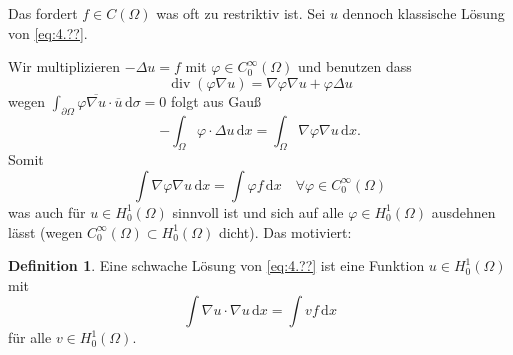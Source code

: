 \documentclass[
paper=a4,
bibtotocnumbered,
liststotocnumbered,
tablecaptionabove,
pointlessnumbers,
twoside,
openright,
10pt
]
{report}
\let\phi\varphi
\theoremstyle{definition}
\newtheorem*{df}{Definition}
\numberwithin{equation}{chapter}
\begin{document}
Das fordert $f\in C(\Omega)$ was oft zu restriktiv ist. Sei $u$ dennoch klassische Lösung von \eqref{eq:4.??}. 

Wir multiplizieren $-\Delta u=f$ mit $\phi \in C_0^\infty(\Omega)$ und benutzen dass
\begin{equation}
\operatorname{div}(\phi \nabla u) = \nabla \phi \nabla u + \phi \Delta u
\end{equation}
wegen $\int_{\partial\Omega} \phi \overline{\nabla u} \cdot \overline u \, \mathrm d\sigma =0$ folgt aus Gauß
\begin{equation}
-\int_\Omega \phi \cdot \Delta u \, \mathrm dx = \int_\Omega \nabla \phi \nabla u \, \mathrm dx.
\end{equation}
Somit
\begin{equation}
\int \nabla \phi \nabla u \, \mathrm dx = \int \phi f \, \mathrm dx \quad \forall \phi \in C_0^\infty(\Omega)
\end{equation}
was auch für $u\in H_0^1(\Omega)$ sinnvoll ist und sich auf alle $\phi \in H_0^1(\Omega)$ ausdehnen lässt (wegen $C_0^\infty(\Omega)\subset H_0^1(\Omega)$ dicht).  Das motiviert:
\begin{df}
Eine schwache Lösung von \eqref{eq:4.??} ist eine Funktion $u\in H_0^1(\Omega)$ mit
\begin{equation}
\int \nabla u \cdot \nabla u \, \mathrm dx = \int v f\, \mathrm dx
\end{equation}
für alle $v\in H_0^1(\Omega)$.
\end{df}
\end{document}
